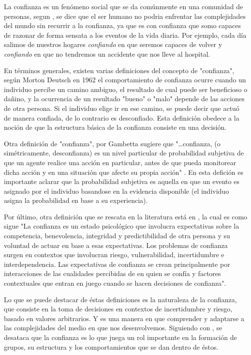 La confianza es un fenómeno social que se da comúnmente en una comunidad de personas, segun \citep{Marsh1994}, se dice que el ser humano no podria enfrentar las complejidades del mundo sin recurrir a la confianza, ya que es con confianza que somo capaces de razonar de forma sensata a los eventos de la vida diaria. Por ejemplo, cada día salimos de nuestros hogares \textit{confiando} en que seremos capaces de volver y \textit{confiando} en que no tendremos un accidente que nos lleve al hospital. 


En términos generales, existen varias definiciones del concepto de "confianza",  según Morton Deutsch en 1962  el comportamiento de confianza ocurre cuando un individuo percibe un camino ambiguo, el resultado de cual puede ser beneficioso o dañino, y la ocurrencia de un resultado "bueno" o "malo" depende de las acciones de otra persona. Si el individuo elige ir en ese camino, se puede decir que actuó de manera confiada, de lo contrario es desconfiado. Esta definición obedece a la noción de que la estructura básica de la confianza consiste en una decisión.

Otra definición de "confianza", por Gambetta sugiere que "…confianza, (o simétricamente, desconfianza) es un nivel particular de probabilidad subjetiva de que un agente realice una acción en particular, antes de que pueda monitorear dicha acción y en una situación que afecte su propia acción" \citep{Medic2012} . En esta defición es importante aclarar que la probabilidad subjetiva es aquella en que un evento es asignado por el individuo basandose en la evidencia disponible (el individuo asigna la probabilidad en base a su experiencia).

Por último, otra definición que se rescata en la literatura está en \cite{Robillard2010}, la cual es como sigue "La confianza es un estado psicológico que involucra expectativas sobre la competencia, benevolencia, integridad y predictibilidad de otra persona y su voluntad de actuar en base a esas expectativas. Los problemas de confianza surgen en contextos que involucran riesgo, vulnerabilidad, incertidumbre e interdependencia. Las expectativas de confianza se crean principalmente por interacciones de las cualidades percibidas de en quien se confía y factores contextuales que entran en juego cuando se hacen decisiones de confianza".

Lo  que se puede destacar de éstas definiciones es la naturaleza de la confianza, que consiste en la toma de decisiones en contextos de incertidumbre y riesgo, basado en valores arbitrarios. Y es una manera en que comprender y adaptarse a las complejidades del medio en que nos desenvolvemos. Siguiendo con \citep{Marsh1994}, se desataca que la confianza es lo que juega un rol importante en la formación de grupos, su estructura y los comportamientos que se dan dentro de éstos. 

